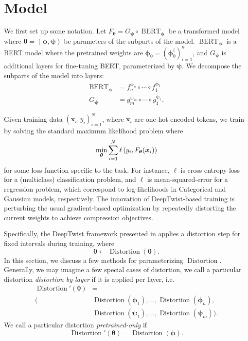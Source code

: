 \documentclass[11pt]{article}
\newcommand{\bert}{\operatorname{BERT}}
\newcommand{\distortion}{\operatorname{Distortion}}
\newcommand{\btheta}{{\bm{\theta}}}
\newcommand{\bphi}{{\bm{\phi}}}
\newcommand{\bpsi}{{\bm{\psi}}}
\begin{document}
\section{Model}
\label{sec:model}

We first set up some notation. Let $F_\btheta = G_\bpsi \circ \bert_\bphi$ be a
transformed model where
$\btheta = (\bphi, \bpsi)$ be parameters of the subparts of the model.
$\bert_\bphi$ is a BERT model where the pretrained weights are $\bphi_0 = 
(\bphi_0^i)_{i=1}^n$, and
$G_\bpsi$ is additional layers for fine-tuning BERT, parameterized by $\bpsi$.
We decompose the subparts of the model into layers: \begin{align*}
\bert_\bphi &= f_{n}^{\bphi_n} \circ \cdots \circ f_1^{\bphi_1} \\
G_\bpsi &= g_{m}^{\bpsi_m} \circ \cdots \circ g_1^{\bpsi_1}.
\end{align*}



Given training data $(\bm x_i, y_i)_{i=1}^N$, where $\bm x_i$ are one-hot
encoded tokens, we train by solving the standard maximum likelihood problem
where \[
\min_{\btheta} \sum_{i=1}^N \ell\pr{y_i, F_\btheta(\bm x_i)}
\]
for some loss function specific to the task. For instance, $\ell$ is cross-entropy
loss for a (multiclass) classification problem, and $\ell$ is mean-squared-error
for a regression problem, which correspond to log-likelihoods in Categorical and
Gaussian models, respectively. The innovation of DeepTwist-based training is
perturbing the usual gradient-based optimization by repeatedly distorting the
current weights to achieve compression objectives.

Specifically, the DeepTwist framework presented in  applies a
distortion
step for fixed intervals during training, where \[
\btheta \gets \distortion(\btheta). 
\]
In this section, we discuss a few methods for parameterizing $\distortion$.
Generally, we may imagine a few special cases of distortion, we call a
particular distortion \emph{distortion by layer} if it is applied per layer,
i.e. \begin{align*}
\distortion'(\btheta) &= \\ (&\distortion(\bphi_1),\ldots,\distortion(\bphi_n),\\
&\distortion(\bpsi_1),\ldots, \distortion(\bpsi_m)).
\end{align*}
We call a particular distortion \emph{pretrained-only} if \[
\distortion'(\btheta) = \distortion(\bphi).
\]
\end{document}
